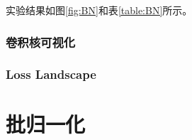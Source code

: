 \documentclass{article}
\begin{document}
实验结果如图\ref{fig:BN}和表\ref{table:BN}所示。

\subsubsection{卷积核可视化}

\subsubsection{Loss Landscape}

\section{批归一化}
	
\end{document}
